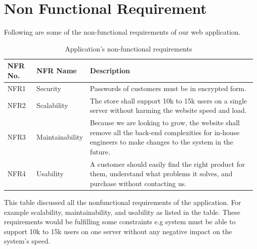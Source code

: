 \section{Non Functional Requirement}
Following are some of the non-functional requirements of our web application.
            \begin{table}[H]
                \centering
               \begin{tabular}{ | m{5em} | m{6em} | m{9cm} | } 
 \hline
 \textbf{NFR No.} & \textbf{NFR Name} &
 \textbf{Description}  \\  \hline
           NFR1 & Security & Passwords of customers must be in encrypted form.
         \\  \hline

           NFR2 & Scalability & The store shall support 10k to 15k users on a single server without harming the website speed and load.
         \\  \hline
           NFR3 & Maintainability & Because we are looking to grow, the website shall remove all the back-end complexities for in-house engineers to make changes to the system in the future.
       \\  \hline
           NFR4 & Usability & A customer should easily find the right product for them, understand what problems it solves, and purchase without contacting us.
         \\  \hline
     \end{tabular}

                \caption{Application’s non-functional requirements}
                \label{Application’s non-functional requirements}
            \end{table}
            This table discussed all the nonfunctional requirements of the application. For example scalability, maintainability, and usability as listed in the table. These requirements would be fulfilling some constraints e.g system must be able to support 10k to 15k users on one server without any negative impact on the system’s speed.
